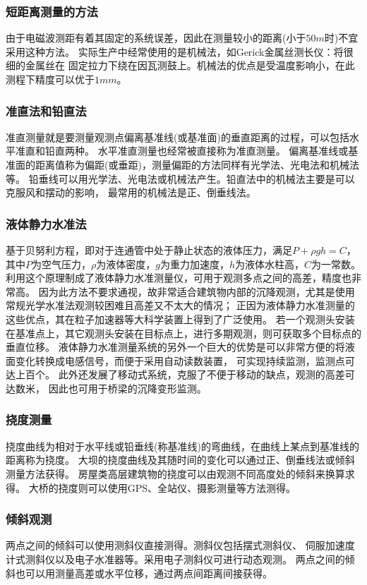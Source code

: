 \subsubsection*{短距离测量的方法}
由于电磁波测距有着其固定的系统误差，因此在测量较小的距离(小于$50m$时)不宜采用这种方法。
实际生产中经常使用的是机械法，如Gerick金属丝测长仪：将很细的金属丝在
固定拉力下绕在因瓦测鼓上。机械法的优点是受温度影响小，在此测程下精度可以优于$1mm$。
\subsubsection*{准直法和铅直法}
准直测量就是要测量观测点偏离基准线(或基准面)的垂直距离的过程，可以包括水平准直和铅直两种。
水平准直测量也经常被直接称为准直测量。
偏离基准线或基准面的距离值称为偏距(或垂距)，测量偏距的方法同样有光学法、光电法和机械法等。
铅垂线可以用光学法、光电法或机械法产生。铅直法中的机械法主要是可以克服风和摆动的影响，
最常用的机械法是正、倒垂线法。
\subsubsection*{液体静力水准法}
基于贝努利方程，即对于连通管中处于静止状态的液体压力，满足$P+{\rho}gh=C$，
其中$P$为空气压力，$\rho$为液体密度，$g$为重力加速度，$h$为液体水柱高，$C$为一常数。
利用这个原理制成了液体静力水准测量仪，可用于观测多点之间的高差，精度也非常高。
因为此方法不要求通视，故非常适合建筑物内部的沉降观测，尤其是使用常规光学水准法观测较困难且高差又不太大的情况；
正因为液体静力水准测量的这些优点，其在粒子加速器等大科学装置上得到了广泛使用。
若一个观测头安装在基准点上，其它观测头安装在目标点上，进行多期观测，则可获取多个目标点的垂直位移。
液体静力水准测量系统的另外一个巨大的优势是可以非常方便的将液面变化转换成电感信号，而便于采用自动读数装置，
可实现持续监测，监测点可达上百个。
此外还发展了移动式系统，克服了不便于移动的缺点，观测的高差可达数米，
因此也可用于桥梁的沉降变形监测。
\subsubsection*{挠度测量}
挠度曲线为相对于水平线或铅垂线(称基准线)的弯曲线，在曲线上某点到基准线的距离称为挠度。
大坝的挠度曲线及其随时间的变化可以通过正、倒垂线法或倾斜测量方法获得。
房屋类高层建筑物的挠度可以由观测不同高度处的倾斜来换算求得。
大桥的挠度则可以使用GPS、全站仪、摄影测量等方法测得。
\subsubsection*{倾斜观测}
两点之间的倾斜可以使用测斜仪直接测得。测斜仪包括摆式测斜仪、
伺服加速度计式测斜仪以及电子水准器等。采用电子测斜仪可进行动态观测。
两点之间的倾斜也可以用测量高差或水平位移，通过两点间距离间接获得。
